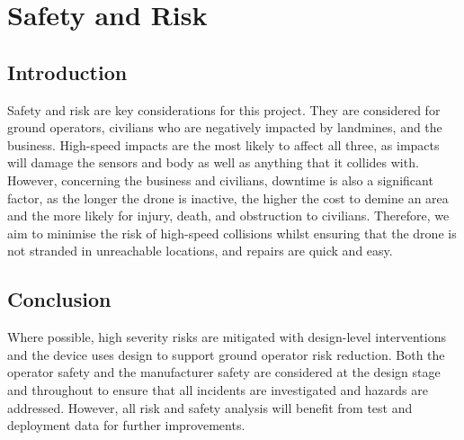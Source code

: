 \section{Safety and Risk}\label{Safety and Risk}
\subsection{Introduction}\label{sub_section:tgt_safety_intro}
Safety and risk are key considerations for this project. They are considered for ground operators, civilians who are negatively impacted by landmines, and the business. High-speed impacts are the most likely to affect all three, as impacts will damage the sensors and body as well as anything that it collides with. However, concerning the business and civilians, downtime is also a significant factor, as the longer the drone is inactive, the higher the cost to demine an area and the more likely for injury, death, and obstruction to civilians. Therefore, we aim to minimise the risk of high-speed collisions whilst ensuring that the drone is not stranded in unreachable locations, and repairs are quick and easy.


\subsection{Conclusion}
Where possible, high severity risks are mitigated with design-level interventions and the device uses design to support ground operator risk reduction. Both the operator safety and the manufacturer safety are considered at the design stage and throughout to ensure that all incidents are investigated and hazards are addressed. However, all risk and safety analysis will benefit from test and deployment data for further improvements.